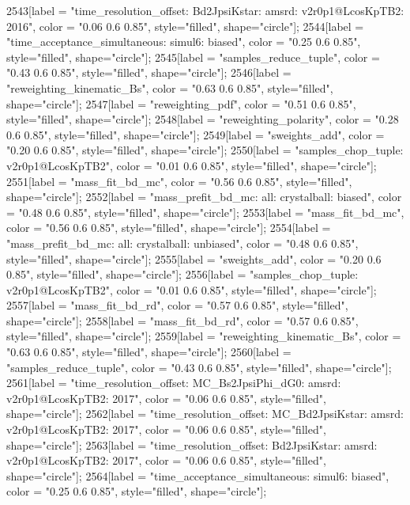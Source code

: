 {	2543[label = "time_resolution_offset\nmode: Bd2JpsiKstar\ntimeres: amsrd\nversion: v2r0p1@LcosKpTB2\nyear: 2016", color = "0.06 0.6 0.85", style="filled", shape="circle"];
	2544[label = "time_acceptance_simultaneous\ntimeacc: simul6\ntrigger: biased", color = "0.25 0.6 0.85", style="filled", shape="circle"];
	2545[label = "samples_reduce_tuple", color = "0.43 0.6 0.85", style="filled", shape="circle"];
	2546[label = "reweighting_kinematic_Bs", color = "0.63 0.6 0.85", style="filled", shape="circle"];
	2547[label = "reweighting_pdf", color = "0.51 0.6 0.85", style="filled", shape="circle"];
	2548[label = "reweighting_polarity", color = "0.28 0.6 0.85", style="filled", shape="circle"];
	2549[label = "sweights_add", color = "0.20 0.6 0.85", style="filled", shape="circle"];
	2550[label = "samples_chop_tuple\nversion: v2r0p1@LcosKpTB2", color = "0.01 0.6 0.85", style="filled", shape="circle"];
	2551[label = "mass_fit_bd_mc", color = "0.56 0.6 0.85", style="filled", shape="circle"];
	2552[label = "mass_prefit_bd_mc\nmassbin: all\nmassmodel: crystalball\ntrigger: biased", color = "0.48 0.6 0.85", style="filled", shape="circle"];
	2553[label = "mass_fit_bd_mc", color = "0.56 0.6 0.85", style="filled", shape="circle"];
	2554[label = "mass_prefit_bd_mc\nmassbin: all\nmassmodel: crystalball\ntrigger: unbiased", color = "0.48 0.6 0.85", style="filled", shape="circle"];
	2555[label = "sweights_add", color = "0.20 0.6 0.85", style="filled", shape="circle"];
	2556[label = "samples_chop_tuple\nversion: v2r0p1@LcosKpTB2", color = "0.01 0.6 0.85", style="filled", shape="circle"];
	2557[label = "mass_fit_bd_rd", color = "0.57 0.6 0.85", style="filled", shape="circle"];
	2558[label = "mass_fit_bd_rd", color = "0.57 0.6 0.85", style="filled", shape="circle"];
	2559[label = "reweighting_kinematic_Bs", color = "0.63 0.6 0.85", style="filled", shape="circle"];
	2560[label = "samples_reduce_tuple", color = "0.43 0.6 0.85", style="filled", shape="circle"];
	2561[label = "time_resolution_offset\nmode: MC_Bs2JpsiPhi_dG0\ntimeres: amsrd\nversion: v2r0p1@LcosKpTB2\nyear: 2017", color = "0.06 0.6 0.85", style="filled", shape="circle"];
	2562[label = "time_resolution_offset\nmode: MC_Bd2JpsiKstar\ntimeres: amsrd\nversion: v2r0p1@LcosKpTB2\nyear: 2017", color = "0.06 0.6 0.85", style="filled", shape="circle"];
	2563[label = "time_resolution_offset\nmode: Bd2JpsiKstar\ntimeres: amsrd\nversion: v2r0p1@LcosKpTB2\nyear: 2017", color = "0.06 0.6 0.85", style="filled", shape="circle"];
	2564[label = "time_acceptance_simultaneous\ntimeacc: simul6\ntrigger: biased", color = "0.25 0.6 0.85", style="filled", shape="circle"];
}
